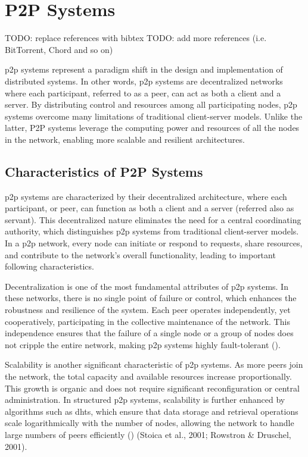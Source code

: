 \chapter{P2P Systems}
TODO: replace references with bibtex
TODO: add more references (i.e. BitTorrent, Chord and so on)


\gls{p2p} systems represent a paradigm shift in the design and implementation of distributed systems.
In other words, \gls{p2p} systems are decentralized networks where each participant, referred to as a peer, can act as both a client and a server.
By distributing control and resources among all participating nodes, \gls{p2p} systems overcome many limitations of traditional client-server models.
Unlike the latter, P2P systems leverage the computing power and resources of all the nodes in the network, enabling more scalable and resilient architectures.

\section{Characteristics of P2P Systems}
\gls{p2p} systems are characterized by their decentralized architecture, where each participant, or peer, can function as both a client and a server (referred also as servant).
This decentralized nature eliminates the need for a central coordinating authority, which distinguishes \gls{p2p} systems from traditional client-server models.
In a \gls{p2p} network, every node can initiate or respond to requests, share resources, and contribute to the network's overall functionality, leading to important following characteristics.

Decentralization is one of the most fundamental attributes of \gls{p2p} systems.
In these networks, there is no single point of failure or control, which enhances the robustness and resilience of the system.
Each peer operates independently, yet cooperatively, participating in the collective maintenance of the network.
This independence ensures that the failure of a single node or a group of nodes does not cripple the entire network, making \gls{p2p} systems highly fault-tolerant (\cite{singh2020}).

Scalability is another significant characteristic of \gls{p2p} systems.
As more peers join the network, the total capacity and available resources increase proportionally.
This growth is organic and does not require significant reconfiguration or central administration.
In structured \gls{p2p} systems, scalability is further enhanced by algorithms such as \glspl{dht}, which ensure that data storage and retrieval operations scale logarithmically with the number of nodes, allowing the network to handle large numbers of peers efficiently (\cite{singh2020}) (Stoica et al., 2001; Rowstron \& Druschel, 2001).

